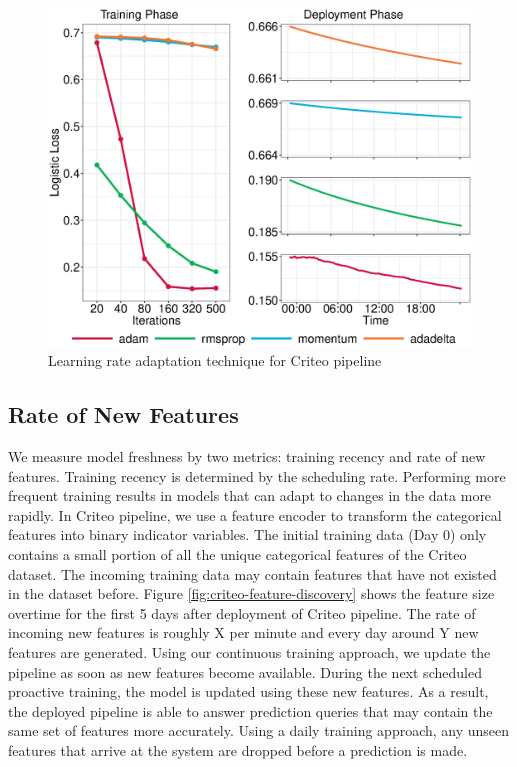 \begin{figure}[H]
\includegraphics[width=\columnwidth]{../images/experiment-results/learning-rate-experiment.eps}
\caption{Learning rate adaptation technique for Criteo pipeline}
\label{fig:criteo-learning-rate}
\end{figure}

\subsection{Rate of New Features}
We measure model freshness by two metrics: training recency and rate of new features.
Training recency is determined by the scheduling rate.
Performing more frequent training results in models that can adapt to changes in the data more rapidly.
In Criteo pipeline, we use a feature encoder to transform the categorical features into binary indicator variables.
The initial training data (Day 0) only contains a small portion of all the unique categorical features of the Criteo dataset.
The incoming training data may contain features that have not existed in the dataset before.
Figure \ref{fig:criteo-feature-discovery} shows the feature size overtime for the first 5 days after deployment of Criteo pipeline.
The rate of incoming new features is roughly X per minute and every day around Y new features are generated.
Using our continuous training approach, we update the pipeline as soon as new features become available.
During the next scheduled proactive training, the model is updated using these new features.
As a result, the deployed pipeline is able to answer prediction queries that may contain the same set of features more accurately.
Using a daily training approach, any unseen features that arrive at the system are dropped before a prediction is made.

